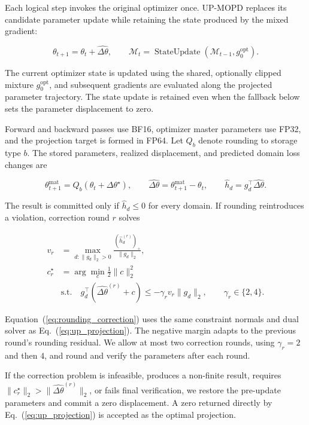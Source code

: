 \documentclass{article}
\begin{document}
Each logical step invokes the original optimizer once. UP-MOPD replaces its candidate parameter update while retaining the state produced by the mixed gradient:

\[
\theta_{t+1}=\theta_t+\widehat{\Delta\theta},\qquad
\mathcal M_t=\operatorname{StateUpdate}(\mathcal M_{t-1},g_0^{\mathrm{opt}}).
\tag{C.4}
\]

The current optimizer state is updated using the shared, optionally clipped mixture $g_0^{\mathrm{opt}}$, and subsequent gradients are evaluated along the projected parameter trajectory. The state update is retained even when the fallback below sets the parameter displacement to zero.

Forward and backward passes use BF16, optimizer master parameters use FP32, and the projection target is formed in FP64. Let $Q_b$ denote rounding to storage type $b$. The stored parameters, realized displacement, and predicted domain loss changes are

\[
\theta_{t+1}^{\mathrm{mat}}=Q_b(\theta_t+\Delta\theta^\star),\qquad
\widehat{\Delta\theta}=\theta_{t+1}^{\mathrm{mat}}-\theta_t,\qquad
\widehat h_d=g_d^\top\widehat{\Delta\theta}.
\tag{C.5}
\]

The result is committed only if $\widehat h_d\le0$ for every domain. If rounding reintroduces a violation, correction round $r$ solves

\[
\begin{aligned}
v_r&=\max_{d:\|g_d\|_2>0}
\frac{(\widehat h_d^{(r)})_+}{\|g_d\|_2},\\
c_r^\star&=\arg\min_c\tfrac12\|c\|_2^2\\
&\text{s.t.}\quad
g_d^\top(\widehat{\Delta\theta}^{(r)}+c)
\le-\gamma_rv_r\|g_d\|_2,\qquad
\gamma_r\in\{2,4\}.
\end{aligned}
\tag{C.6}\label{eq:rounding_correction}
\]

Equation~(\ref{eq:rounding_correction}) uses the same constraint normals and dual solver as Eq.~(\ref{eq:up_projection}). The negative margin adapts to the previous round's rounding residual. We allow at most two correction rounds, using $\gamma_r=2$ and then $4$, and round and verify the parameters after each round.

If the correction problem is infeasible, produces a non-finite result, requires $\|c_r^\star\|_2>\|\widehat{\Delta\theta}^{(r)}\|_2$, or fails final verification, we restore the pre-update parameters and commit a zero displacement. A zero returned directly by Eq.~(\ref{eq:up_projection}) is accepted as the optimal projection.
\end{document}
